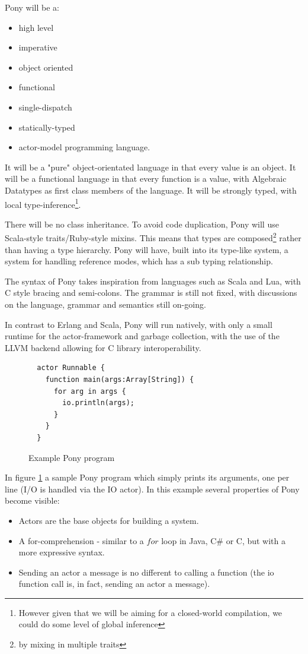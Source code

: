 \documentclass[11pt,a4paper]{report}
\begin{document}
Pony will be a:
\begin{itemize}[noitemsep]
	\item high level
	\item imperative
	\item object oriented
	\item functional
	\item single-dispatch
	\item statically-typed
	\item actor-model programming language.
\end{itemize}
It will be a "pure" object-orientated language in that every value is an object.
It will be a functional language in that every function is a value, with Algebraic Datatypes as first class members of the language.
It will be strongly typed, with local type-inference\footnote{However given that we will be aiming for a closed-world compilation, we could do some level of global inference}.

There will be no class inheritance.
To avoid code duplication, Pony will use Scala-style traits/Ruby-style mixins.
This means that types are composed\footnote{by mixing in multiple traits} rather than having a type hierarchy.
Pony will have, built into its type-like system, a system for handling reference modes, which has a sub typing relationship.

The syntax of Pony takes inspiration from languages such as Scala and Lua\cite{lua}, with C style bracing and semi-colons.
The grammar is still not fixed, with discussions on the language, grammar and semantics still on-going.

In contrast to Erlang and Scala, Pony will run natively, with only a small runtime for the actor-framework and garbage collection, with the use of the LLVM backend allowing for C library interoperability.

\begin{figure}[H]
\begin{verbatim}
  actor Runnable {
    function main(args:Array[String]) {
      for arg in args {
      	io.println(args);
      }
    }
  }
\end{verbatim}
\caption{Example Pony program}
\label{fig:simple}
\end{figure}

In figure \ref{fig:simple} a sample Pony program which simply prints its arguments, one per line (I/O is handled via the IO actor).
In this example several properties of Pony become visible:
\begin{itemize}[noitemsep]
	\item Actors are the base objects for building a system.
	\item A for-comprehension - similar to a $for$ loop in Java, C\# or C, but with
		a more expressive syntax.
	\item Sending an actor a message is no different to calling a function (the io function call is, in fact, sending an actor a message).
\end{itemize}
\end{document}
